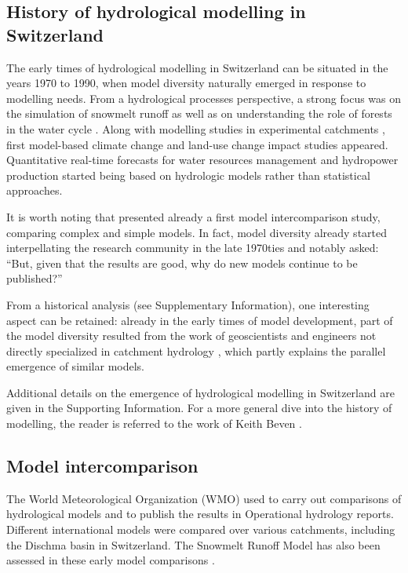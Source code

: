 \documentclass[10pt,a4paper]{article}
\begin{document}
\subsection{History of hydrological modelling in Switzerland}
\label{sec:models:history}

The early times of hydrological modelling in Switzerland can be situated in the years 1970 to 1990, when model diversity naturally emerged in response to modelling needs. From a hydrological processes perspective, a strong focus was on the simulation of snowmelt runoff \citep{braun1986} as well as on understanding the role of forests in the water cycle \citep{keller1991,forster1989}. Along with modelling studies in experimental catchments \citep{Iorgulescu1994}, first model-based climate change \citep{bultot1992a} and land-use change \citep{jordan1990a} impact studies appeared. Quantitative real-time forecasts for water resources management \citep{p1969} and hydropower production \citep{jensenlang1973} started being based on hydrologic models rather than statistical approaches.

It is worth noting that \citet{naef1977} presented already a first model intercomparison study, comparing complex and simple models. In fact, model diversity already started interpellating the research community in the late 1970ties and \citet{f1981} notably asked: ``But, given that the results are good, why do new models continue to be published?'' 

From a historical analysis (see Supplementary Information), one interesting aspect can be retained: already in the early times of model development, part of the model diversity resulted from the work of geoscientists and engineers not directly specialized in catchment hydrology \citep{Abednego1990,k1986a,hager1984,sautier1980}, which partly explains the parallel emergence of similar models. 

Additional details on the emergence of hydrological modelling in Switzerland are given in the Supporting Information. For a more general dive into the history of modelling, the reader is referred to the work of Keith Beven \citep{Beven_2020,Beven_2020a}.

\subsection{Model intercomparison}
\label{sec:models:intercomparison}

The World Meteorological Organization (WMO) used to carry out comparisons of hydrological models and to publish the results in Operational hydrology reports. Different international models were compared over various catchments, including the Dischma basin in Switzerland. The Snowmelt Runoff Model \citep[SRM,][see supplementary material]{martinec1975} has also been assessed in these early model comparisons \citep{WMO1986, WMO1992}.
\end{document}

